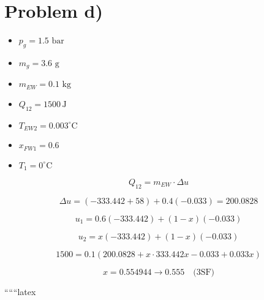 \section*{Problem d)}

\begin{itemize}
    \item $p_{g} = 1.5 \text{ bar}$
    \item $m_{g} = 3.6 \text{ g}$
    \item $m_{EW} = 0.1 \text{ kg}$
    \item $Q_{12} = 1500 \, \text{J}$
    \item $T_{EW2} = 0.003^\circ \text{C}$
    \item $x_{FW1} = 0.6$
    \item $T_1 = 0^\circ \text{C}$
\end{itemize}

\[
Q_{12} = m_{EW} \cdot \Delta u
\]

\[
\Delta u = \left( -333.442 + 58 \right) + 0.4 \left( -0.033 \right) = 200.0828
\]

\[
u_1 = 0.6 \left( -333.442 \right) + (1 - x) \left( -0.033 \right)
\]

\[
u_2 = x \left( -333.442 \right) + (1 - x) \left( -0.033 \right)
\]

\[
1500 = 0.1 \left( 200.0828 + x \cdot 333.442 x - 0.033 + 0.033 x \right)
\]

\[
x = 0.554944 \rightarrow 0.555 \quad \text{(3SF)}
\]

``````latex